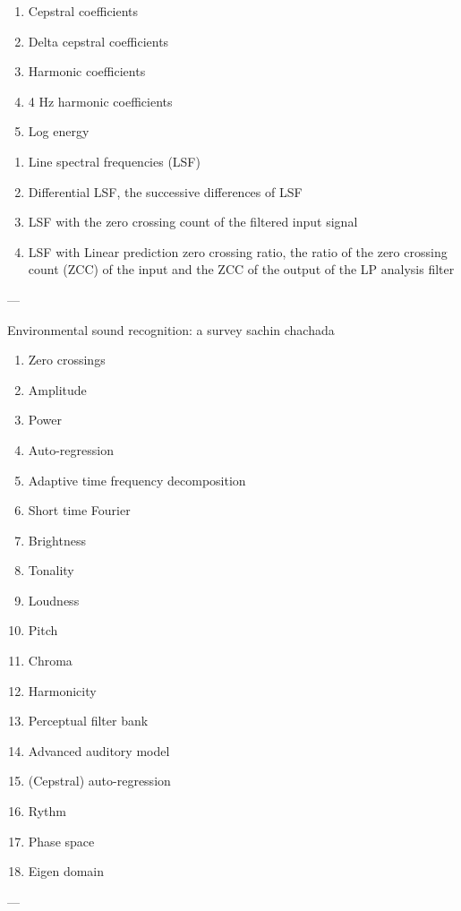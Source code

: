 \begin{enumerate}[noitemsep]
\item Cepstral coefficients
\item Delta cepstral coefficients
\item Harmonic coefficients
\item 4 Hz harmonic coefficients
\item Log energy
\end{enumerate}
\begin{enumerate}[noitemsep]
\item Line spectral frequencies (LSF)
\item Differential LSF, the successive differences of LSF
\item LSF with the zero crossing count of the filtered input signal
\item LSF with Linear prediction zero crossing ratio, the ratio of the
  zero crossing count (ZCC) of the input and the ZCC of the output of
  the LP analysis filter
\end{enumerate}

---

Environmental sound recognition: a survey
sachin chachada

\begin{enumerate}[noitemsep]
\item Zero crossings
\item Amplitude
\item Power
\item Auto-regression
\item Adaptive time frequency decomposition
\item Short time Fourier
\item Brightness
\item Tonality
\item Loudness
\item Pitch
\item Chroma
\item Harmonicity
\item Perceptual filter bank
\item Advanced auditory model
\item (Cepstral) auto-regression
\item Rythm
\item Phase space
\item Eigen domain
\end{enumerate}

---
